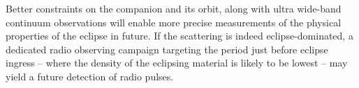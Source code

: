 \documentclass[fleqn,usenatbib]{mnras}
\newcommand{\todo}[1]{\textcolor{red}{TODO: #1}\PackageWarning{TODO:}{#1!}}
\newcommand{\blinky}{{4FGL}~J1646}
\begin{document}
Better constraints on the companion and its orbit, along with ultra wide-band continuum observations will enable more precise measurements of the physical properties of the eclipse in future. If the scattering is indeed eclipse-dominated, a dedicated radio observing campaign targeting the period just before eclipse ingress -- where the density of the eclipsing material is likely to be lowest -- may yield a future detection of radio pulses.



















\end{document}
